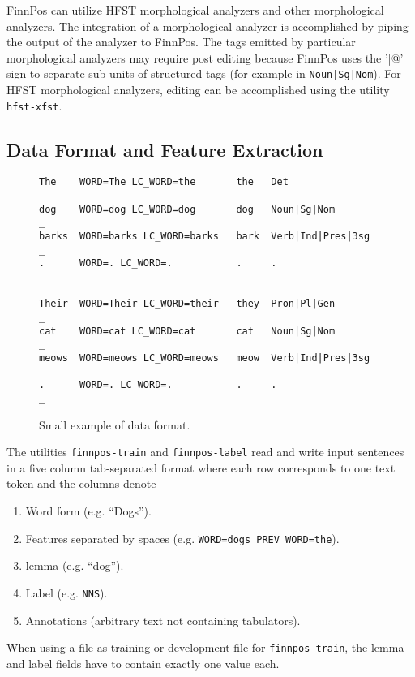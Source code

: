 \documentclass{llncs}
\begin{document}
FinnPos can utilize HFST morphological analyzers and other
morphological analyzers. The integration of a morphological analyzer
is accomplished by piping the output of the analyzer to FinnPos. The
tags emitted by particular morphological analyzers may require post
editing because FinnPos uses the '\verb@|@' sign to separate sub units
of structured tags (for example in {\tt Noun|Sg|Nom}). For HFST
morphological analyzers, editing can be accomplished using the utility
{\tt hfst-xfst}.

\subsection{Data Format and Feature Extraction}

\begin{figure}
\begin{framed}
\begin{verbatim}
The    WORD=The LC_WORD=the       the   Det                _
dog    WORD=dog LC_WORD=dog       dog   Noun|Sg|Nom        _
barks  WORD=barks LC_WORD=barks   bark  Verb|Ind|Pres|3sg  _
.      WORD=. LC_WORD=.           .     .                  _

Their  WORD=Their LC_WORD=their   they  Pron|Pl|Gen        _
cat    WORD=cat LC_WORD=cat       cat   Noun|Sg|Nom        _
meows  WORD=meows LC_WORD=meows   meow  Verb|Ind|Pres|3sg  _
.      WORD=. LC_WORD=.           .     .                  _
\end{verbatim}
\end{framed}
\caption{Small example of data format.}
\end{figure}

The utilities {\tt finnpos-train} and {\tt finnpos-label} read and write input
sentences in a five column tab-separated format where each row
corresponds to one text token and the columns denote

\begin{enumerate}
  \item  Word form (e.g. ``Dogs'').
  \item  Features separated by spaces (e.g. \verb|WORD=dogs PREV_WORD=the|).
  \item  lemma (e.g. ``dog'').
  \item  Label (e.g. \verb|NNS|).
  \item  Annotations (arbitrary text not containing tabulators).
\end{enumerate}

When using a file as training or development file for {\tt finnpos-train}, the lemma and label fields have to contain exactly one value each.
\end{document}
